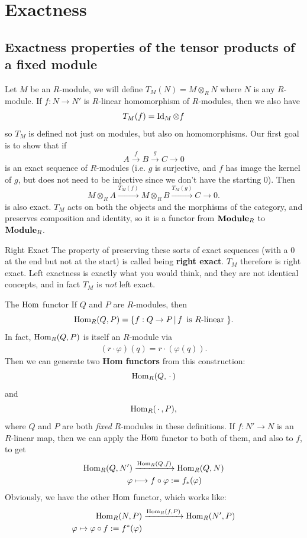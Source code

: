 \documentclass{article}
\begin{document}
\section{Exactness}
\subsection{Exactness properties of the tensor products of a fixed module}
Let $M$ be an $R$-module, we will define $T_{M}(N)=M \otimes_{R} N$ where $N$ is any $R$-module. If $f: N \to N'$ is $R$-linear homomorphism of $R$-modules, then we also have \[ T_{M}(f) = \operatorname{Id}_{M} \otimes f\] so $T_{M}$ is defined not just on modules, but also on homomorphisms. \gap Our first goal is to show that if \[ A \xrightarrow f B \xrightarrow g C \rightarrow 0 \] is an exact sequence of $R$-modules (i.e. $g$ is surjective, and $f$ has image the kernel of $g$, but does not need to be injective since we don't have the starting $0$). Then \[ M \otimes_{R} A \xrightarrow{T_{M}(f)} M \otimes_{R} B \xrightarrow{T_{M}(g)} C \rightarrow 0.\] is also exact. $T_{M}$ acts on both the objects and the morphisms of the category, and preserves composition and identity, so it is a functor from $\textbf{Module$_{R}$}$ to $\textbf{Module$_{R}$}$.
\begin{fancydefine*}{Right Exact}
     The property of preserving these sorts of exact sequences (with a $0$ at the end but not at the start) is called being \textbf{right exact}. $T_{M}$ therefore is right exact.
    \gap Left exactness is exactly what you would think, and they are not identical concepts, and in fact $T_{M}$ is \textit{not} left exact.
\end{fancydefine*}
\begin{fancydefine}{The $\operatorname{Hom}$ functor}
    If $Q$ and $P$ are $R$-modules, then \[ \operatorname{Hom}_{R}(Q,P) = \{ f: Q \to P \, | \,  f \, \text{ is $R$-linear } \}.\] In fact, $\operatorname{Hom}_{R}(Q,P)$ is itself an $R$-module via 
    \begin{align*}
        (r \cdot \varphi)(q) = r \cdot (\varphi(q)).
    \end{align*}
    Then we can generate two \textbf{Hom functors} from this construction: \[ \operatorname{Hom}_{R}(Q, \, \cdot \,) \] and \[ \operatorname{Hom}_{R}(\, \cdot \,, P),\] where $Q$ and $P$ are both \textit{fixed} $R$-modules in these definitions. 
    \gap
    If $f: N' \to N$ is an $R$-linear map, then we can apply the $\operatorname{Hom}$ functor to both of them, and also to $f$, to get 
    \begin{align*} 
        \operatorname{Hom}_{R}(Q,N') &\xrightarrow{\operatorname{Hom}_{R}(Q,f)} \operatorname{Hom}_{R}(Q,N)\\
        \varphi &\longmapsto f \circ \varphi := f_{*}(\varphi)
    \end{align*}
    Obviously, we have the other $\operatorname{Hom}$ functor, which works like: 
    \begin{align*}
        \operatorname{Hom}_{R}(N,P) &\xrightarrow{\operatorname{Hom}_{R}(f,P)} \operatorname{Hom}_{R}(N',P)\\
        \varphi \mapsto \varphi \circ f := f^{*}(\varphi)
    \end{align*}
\end{fancydefine}
\end{document}
